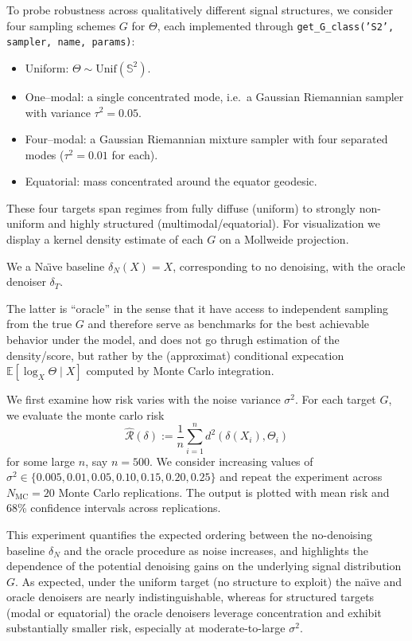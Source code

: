 \documentclass{article}
\begin{document}
To probe robustness across qualitatively different signal structures, we consider four sampling schemes $G$ for $\Theta$, each implemented through \texttt{get\_G\_class('S2', sampler, name, params)}:
\begin{itemize}
\item Uniform: $\Theta\sim \mathrm{Unif}(\mathbb{S}^2)$.
\item One--modal: a single concentrated mode, i.e.\ a Gaussian Riemannian sampler with variance $\tau^2=0.05$.
\item Four--modal: a Gaussian Riemannian mixture sampler with four separated modes ($\tau^2=0.01$ for each).
\item Equatorial: mass concentrated around the equator geodesic.
\end{itemize}

These four targets span regimes from fully diffuse (uniform) to strongly non-uniform and highly structured (multimodal/equatorial). For visualization we display a kernel density estimate of each $G$ on a Mollweide projection.

We a Na\"{\i}ve baseline $\delta_N(X)=X$, corresponding to no denoising,
with the oracle denoiser $\delta_T$.

The latter is ``oracle'' in the sense that it have access to independent sampling from the true $G$ and therefore serve as benchmarks for the best achievable behavior under the model, and does not go thrugh estimation of the density/score, but rather by the (approximat) conditional expecation $\mathbb{E}[\log_X\Theta \mid X]$ computed by Monte Carlo integration.


We first examine how risk varies with the noise variance $\sigma^2$. For each target $G$, we evaluate the monte carlo risk
\[
\widehat{\mathcal{R}}(\delta) := \frac{1}{n}\sum_{i=1}^n d^2\!\left(\delta(X_i),\Theta_i\right)
\]
for some large $n$, say $n=500$.
We consider increasing values of$\sigma^2 \in \{0.005,0.01,0.05,0.10, 0.15, 0.20, 0.25\}$  and repeat the experiment across $N_{\mathrm{MC}}=20$ Monte Carlo replications. The output is plotted with mean risk and 68\% confidence intervals across replications.

This experiment quantifies the expected ordering between the no-denoising baseline $\delta_N$ and the oracle procedure as noise increases, and highlights the dependence of the potential denoising gains on the underlying signal distribution $G$. As expected, under the uniform target (no structure to exploit) the na\"{\i}ve and oracle denoisers are nearly indistinguishable, whereas for structured targets (modal or equatorial) the oracle denoisers leverage concentration and exhibit substantially smaller risk, especially at moderate-to-large $\sigma^2$.
\end{document}
